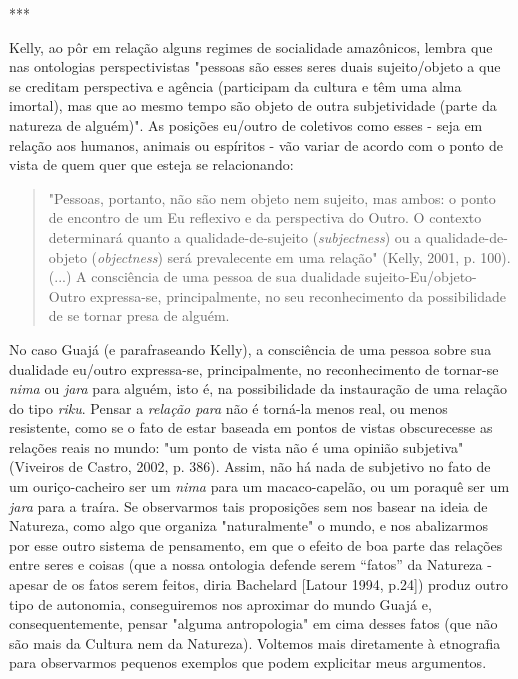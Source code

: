 ***

Kelly, ao pôr em relação alguns regimes de socialidade amazônicos,
lembra que nas ontologias perspectivistas "pessoas são esses seres duais
sujeito/objeto a que se creditam perspectiva e agência (participam da
cultura e têm uma alma imortal), mas que ao mesmo tempo são objeto de
outra subjetividade (parte da natureza de alguém)". As posições eu/outro
de coletivos como esses - seja em relação aos humanos, animais ou
espíritos - vão variar de acordo com o ponto de vista de quem quer que
esteja se relacionando:

\begin{quote}
"Pessoas, portanto, não são nem objeto nem sujeito, mas ambos: o ponto
de encontro de um Eu reflexivo e da perspectiva do Outro. O contexto
determinará quanto a qualidade-de-sujeito (\emph{subjectness}) ou a
qualidade-de-objeto (\emph{objectness}) será prevalecente em uma
relação" (Kelly, 2001, p. 100). (...) A consciência de uma pessoa de sua
dualidade sujeito-Eu/objeto-Outro expressa-se, principalmente, no seu
reconhecimento da possibilidade de se tornar presa de alguém.
\end{quote}

No caso Guajá (e parafraseando Kelly), a consciência de uma pessoa sobre
sua dualidade eu/outro expressa-se, principalmente, no reconhecimento de
tornar-se \emph{nima} ou \emph{jara} para alguém, isto é, na
possibilidade da instauração de uma relação do tipo \emph{riku}. Pensar
a \emph{relação para} não é torná-la menos real, ou menos resistente,
como se o fato de estar baseada em pontos de vistas obscurecesse as
relações reais no mundo: "um ponto de vista não é uma opinião subjetiva"
(Viveiros de Castro, 2002, p. 386). Assim, não há nada de subjetivo no
fato de um ouriço-cacheiro ser um \emph{nima} para um macaco-capelão, ou
um poraquê ser um \emph{jara} para a traíra. Se observarmos tais
proposições sem nos basear na ideia de Natureza, como algo que organiza
"naturalmente" o mundo, e nos abalizarmos por esse outro sistema de
pensamento, em que o efeito de boa parte das relações entre seres e
coisas (que a nossa ontologia defende serem ``fatos'' da Natureza -
apesar de os fatos serem feitos, diria Bachelard {[}Latour 1994,
p.24{]}) produz outro tipo de autonomia, conseguiremos nos aproximar do
mundo Guajá e, consequentemente, pensar "alguma antropologia" em cima
desses fatos (que não são mais da Cultura nem da Natureza). Voltemos
mais diretamente à etnografia para observarmos pequenos exemplos que
podem explicitar meus argumentos.


